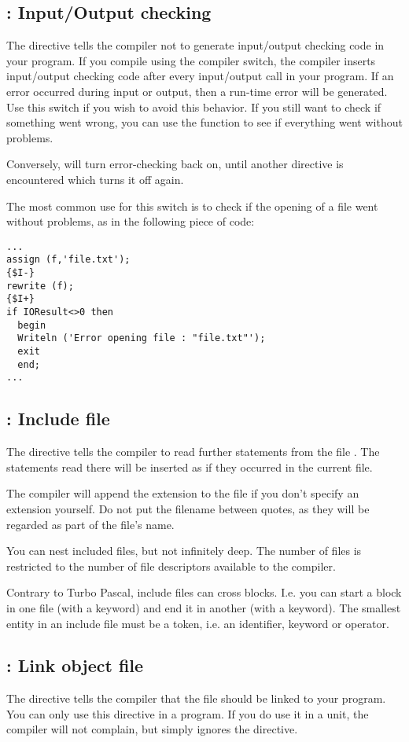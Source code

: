 \documentclass{report}
\begin{document}
\subsection{ : Input/Output checking}
The  directive tells the compiler not to generate input/output
checking code in your program. If you compile using the  compiler
switch, the \fpc compiler inserts input/output
checking code after every input/output call in your program. If an error
occurred during input or output, then a run-time error will be generated.
Use this switch if you wish to avoid this behavior. 
If you still want to check if something went wrong, you can use the
 function to see if everything went without problems.

Conversely,  will turn error-checking back on, until another
directive is encountered which turns it off again.

The most common use for this switch is to check if the opening of a file
went without problems, as in the following piece of code:
\begin{verbatim}
...
assign (f,'file.txt');
{$I-}
rewrite (f);
{$I+}
if IOResult<>0 then
  begin
  Writeln ('Error opening file : "file.txt"');
  exit
  end;
...
\end{verbatim}

\subsection{ : Include file }
The  directive tells the compiler to read further
statements from the file . The statements read there will be
inserted as if they occurred in the current file.

The compiler will append the  extension to the file if you don't
specify an extension yourself. Do not put the filename between quotes, as
they will be regarded as part of the file's name.

You can nest included files, but not infinitely deep. The number of files is
restricted to the number of file descriptors available to the \fpc compiler.

Contrary to Turbo Pascal, include files can cross blocks. I.e. you can start
a block in one file (with a  keyword) and end it in another (with
a  keyword). The smallest entity in an include file must be a token,
i.e. an identifier, keyword or operator.

\subsection{ : Link object file}
The  directive tells the compiler that the file 
should be linked to your program. You can only use this directive in a
program. If you do use it in a unit, the compiler will not complain, but
simply ignores the directive.
\end{document}
